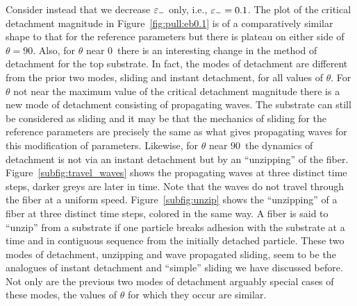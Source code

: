 Consider instead that we decrease $\varepsilon_-$ only, i.e., $\varepsilon_-=0.1$. The plot of the critical detachment magnitude in Figure~\ref{fig:pull:eb0.1} is of a comparatively similar shape to that for the reference parameters but there is plateau on either side of $\theta=90$\textdegree. Also, for $\theta$ near $0$\textdegree\ there is an interesting change in the method of detachment for the top substrate. In fact, the modes of detachment are different from the prior two modes, sliding and instant detachment, for all values of $\theta$. For $\theta$ not near the maximum value of the critical detachment magnitude there is a new mode of detachment consisting of propagating waves. The substrate can still be considered as sliding and it may be that the mechanics of sliding for the reference parameters are precisely the same as what gives propagating waves for this modification of parameters. Likewise, for $\theta$ near $90$\textdegree\ the dynamics of detachment is not via an instant detachment but by an ``unzipping'' of the fiber. Figure~\ref{subfig:travel_waves} shows the propagating waves at three distinct time steps, darker greys are later in time. Note that the waves do not travel through the fiber at a uniform speed. Figure~\ref{subfig:unzip} shows the ``unzipping'' of a fiber at three distinct time steps, colored in the same way. A fiber is said to ``unzip'' from a substrate if one particle breaks adhesion with the substrate at a time and in contiguous sequence from the initially detached particle. These two modes of detachment, unzipping and wave propagated sliding, seem to be the analogues of instant detachment and ``simple'' sliding we have discussed before. Not only are the previous two modes of detachment arguably special cases of these modes, the values of $\theta$ for which they occur are similar.

